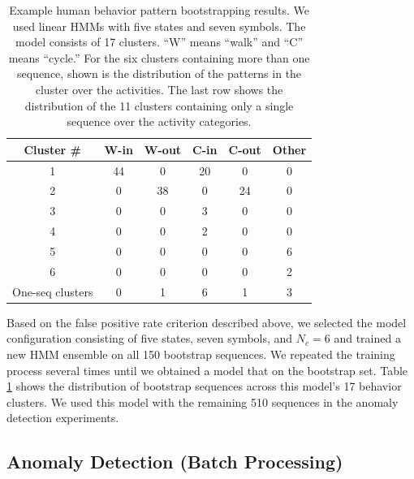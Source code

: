 \begin{table}[t]
  \caption[Example human behavior pattern bootstrapping
    results.]{\small Example human behavior pattern bootstrapping
    results. We used linear HMMs with five states and seven
    symbols. The model consists of 17 clusters. ``W'' means ``walk''
    and ``C'' means ``cycle.'' For the six clusters containing more
    than one sequence, shown is the distribution of the patterns in
    the cluster over the activities.  The last row shows the
    distribution of the 11 clusters containing only a single sequence
    over the activity categories.}
  \begin{center}
    \begin{tabular}{c|c|c|c|c|c}
      \hline
      Cluster \# & W-in & W-out & C-in & C-out & Other \\
      \hline \hline
      1 & 44 & 0  & 20 & 0  & 0 \\ \hline
      2 & 0  & 38 & 0  & 24 & 0 \\ \hline
      3 & 0  & 0  & 3  & 0  & 0 \\ \hline
      4 & 0  & 0  & 2  & 0  & 0 \\ \hline
      5 & 0  & 0  & 0  & 0  & 6 \\ \hline
      6 & 0  & 0  & 0  & 0  & 2 \\ \hline
      One-seq clusters & 0 & 1 & 6 & 1 & 3 \\ \hline
    \end{tabular}
  \end{center}
  \label{tab:bootstrapping-results}
\end{table}

Based on the false positive rate criterion described above, we
selected the model configuration consisting of five states, seven
symbols, and $N_c = 6$ and trained a new HMM ensemble on all 150
bootstrap sequences.  We repeated the training process several times
until we obtained a model that \DIFdelbegin {}\DIFdelend \DIFaddbegin {}\DIFaddend on the bootstrap set.  
Table \ref{tab:bootstrapping-results} shows the
distribution of bootstrap sequences across this model's 17 behavior
clusters. We used this model with the remaining 510 sequences in the
anomaly detection experiments.

\subsection{Anomaly Detection (Batch Processing)}
\label{incremental-against-global-method}

